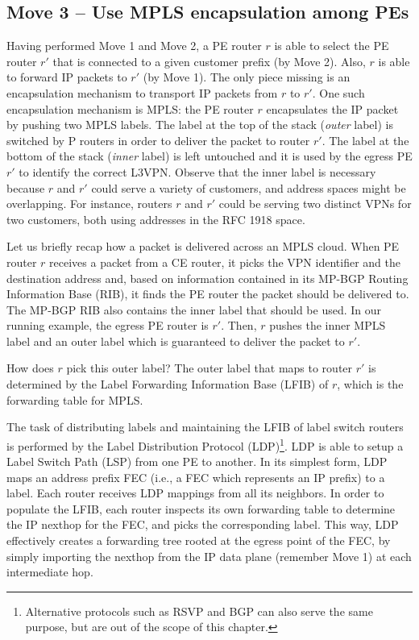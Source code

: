\documentclass{article}
\begin{document}
\subsection{Move 3 -- Use MPLS encapsulation among PEs}
Having performed Move 1 and Move 2, a PE router $r$ is able to select the PE 
router $r'$ that is connected to a given customer prefix (by Move 2). Also, $r$ is 
able to forward IP packets to $r'$ (by Move 1). The only piece missing is an 
encapsulation mechanism to transport IP packets from $r$ to $r'$. One such 
encapsulation mechanism is MPLS: the PE router $r$ encapsulates the IP packet by 
pushing two MPLS labels. The label at the top of the stack (\emph{outer} label) 
is switched by P routers in order to deliver the packet to router $r'$. The 
label at the bottom of the stack (\emph{inner} label) is left untouched and it 
is used by the egress PE $r'$ to identify the correct L3VPN. Observe that the 
inner label is necessary because $r$ and $r'$ could serve a variety of 
customers, and address spaces might be overlapping. For instance, routers $r$ 
and $r'$ could be serving two distinct VPNs for two customers, both using 
addresses in the RFC 1918 space.

Let us briefly recap how a packet is delivered across an MPLS cloud. When PE 
router $r$ receives a packet from a CE router, it picks the VPN identifier and 
the destination address and, based on information contained in its MP-BGP 
Routing Information Base (RIB), it finds the PE router the packet should be 
delivered to. The MP-BGP RIB also contains the inner label that should be used. 
In our running example, the egress PE router is $r'$. Then, $r$ pushes the inner 
MPLS label and an outer label which is guaranteed to deliver the packet to 
$r'$. 

How does $r$ pick this outer label? The outer label that maps to router $r'$ is 
determined by the Label Forwarding Information Base (LFIB) of $r$, which is the 
forwarding table for MPLS.

The task of distributing labels and maintaining the LFIB of label switch routers 
is performed by the Label Distribution Protocol 
(LDP)\cite{rfc5036}\footnote{Alternative protocols such as RSVP and BGP can also 
serve the same purpose, but are out of the scope of this chapter.}. LDP is able 
to setup a Label Switch Path (LSP) from one PE to another. In its simplest form, 
LDP maps an address prefix FEC (i.e., a FEC which represents an IP prefix) to a 
label. Each router receives LDP mappings from all its neighbors. In order to 
populate the LFIB, each router inspects its own forwarding table to determine 
the IP nexthop for the FEC, and picks the corresponding label. This way, LDP 
effectively creates a forwarding tree rooted at the egress point of the FEC, by 
simply importing the nexthop from the IP data plane (remember Move 1) at each 
intermediate hop.
\end{document}
